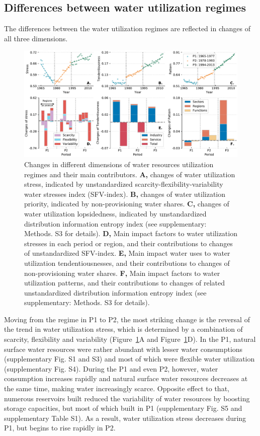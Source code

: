 \documentclass[9pt, twocolumn, twoside, lineno]{pnas-new}
\begin{document}
\subsection*{Differences between water utilization regimes}
The differences between the water utilization regimes are reflected in changes of all three dimensions.
\begin{figure}%
	\centering
	\includegraphics[width=\linewidth]{../../figures/main/dimensions.pdf}
	\caption{
		Changes in different dimensions of water resources utilization regimes and their main contributors.
		\textbf{A,} changes of water utilization stress, indicated by unstandardized scarcity-flexibility-variability water stresses index (SFV-index).
		\textbf{B,} changes of water utilization priority, indicated by non-provisioning water shares.
		\textbf{C,} changes of water utilization lopsidedness, indicated by unstandardized distribution information entropy index (see supplementary: Methods. S3 for details).
		\textbf{D,} Main impact factors to water utilization stresses in each period or region, and their contributions to changes of unstandardized SFV-index.
		\textbf{E,} Main impact water uses to water utilization tendentiousnesses, and their contributions to changes of non-provisioning water shares.
		\textbf{F,} Main impact factors to water utilization patterns, and their contributions to changes of related unstandardized distribution information entropy index (see supplementary: Methods. S3 for details).
		}
	\label{fig:dimensions}
\end{figure}
Moving from the regime in P1 to P2, the most striking change is the reversal of the trend in water utilization stress, which is determined by a combination of scarcity, flexibility and variability (Figure~\ref{fig:dimensions}A and Figure~\ref{fig:dimensions}D).   
In the P1, natural surface water resources were rather abundant with lesser water consumptions (supplementary Fig. S1 and S3) and most of which were flexible water utilization (supplementary Fig. S4). During the P1 and even P2, however, water consumption increases rapidly and natural surface water resources decreases at the same time, making water increasingly scarce. Opposite effect to that, numerous reservoirs built reduced the variability of water resources by boosting storage capacities, but most of which built in P1 (supplementary Fig. S5 and supplementary Table S1). As a result, water utilization stress decreases during P1, but begins to rise rapidly in P2.
\end{document}
